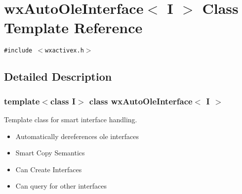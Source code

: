 \section{wx\-Auto\-Ole\-Interface$<$ I $>$ Class Template Reference}
\label{classwxAutoOleInterface}
{\tt \#include $<$wxactivex.h$>$}



\subsection{Detailed Description}
\subsubsection*{template$<$class I$>$ class wx\-Auto\-Ole\-Interface$<$ I $>$}

Template class for smart interface handling.

\begin{itemize}
\item Automatically dereferences ole interfaces\item Smart Copy Semantics\item Can Create Interfaces\item Can query for other interfaces \end{itemize}




